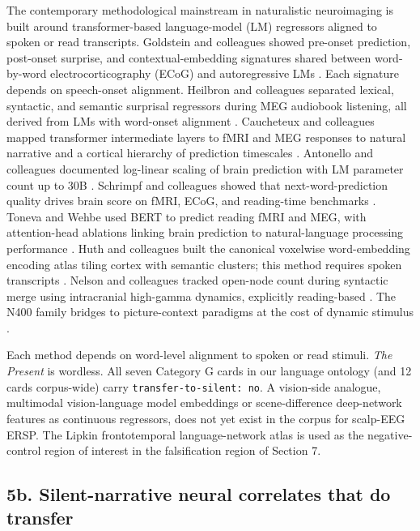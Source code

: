 \documentclass[preprint,12pt]{elsarticle}
\begin{document}
The contemporary methodological mainstream in naturalistic neuroimaging is built around transformer-based language-model (LM) regressors aligned to spoken or read transcripts. Goldstein and colleagues showed pre-onset prediction, post-onset surprise, and contextual-embedding signatures shared between word-by-word electrocorticography (ECoG) and autoregressive LMs \cite{Goldstein2022SharedCP}. Each signature depends on speech-onset alignment. Heilbron and colleagues separated lexical, syntactic, and semantic surprisal regressors during MEG audiobook listening, all derived from LMs with word-onset alignment \cite{Heilbron2020AHO}. Caucheteux and colleagues mapped transformer intermediate layers to fMRI and MEG responses to natural narrative \cite{Caucheteux2022BrainsAA} and a cortical hierarchy of prediction timescales \cite{Caucheteux2023EvidenceOA}. Antonello and colleagues documented log-linear scaling of brain prediction with LM parameter count up to 30B \cite{Antonello2023ScalingLF}. Schrimpf and colleagues showed that next-word-prediction quality drives brain score on fMRI, ECoG, and reading-time benchmarks \cite{schrimpf2021the}. Toneva and Wehbe used BERT to predict reading fMRI and MEG, with attention-head ablations linking brain prediction to natural-language processing performance \cite{toneva2019interpreting}. Huth and colleagues built the canonical voxelwise word-embedding encoding atlas tiling cortex with semantic clusters; this method requires spoken transcripts \cite{Huth2016NaturalSR}. Nelson and colleagues tracked open-node count during syntactic merge using intracranial high-gamma dynamics, explicitly reading-based \cite{Nelson2017NeurophysiologicalDO}. The N400 family bridges to picture-context paradigms at the cost of dynamic stimulus \cite{Kutas2011ThirtyYA,DeLong2005ProbabilisticWP}.

Each method depends on word-level alignment to spoken or read stimuli. \textit{The Present} is wordless. All seven Category G cards in our language ontology (and 12 cards corpus-wide) carry \texttt{transfer-to-silent: no}. A vision-side analogue, multimodal vision-language model embeddings or scene-difference deep-network features as continuous regressors, does not yet exist in the corpus for scalp-EEG ERSP. The Lipkin frontotemporal language-network atlas \cite{Lipkin2022ProbabilisticAF} is used as the negative-control region of interest in the falsification region of Section 7.

\subsection{5b. Silent-narrative neural correlates that do transfer}
\end{document}
